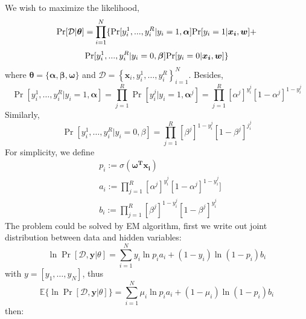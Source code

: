 \documentclass{article}
\begin{document}
We wish to maximize the likelihood,
$$\textup{Pr}[\mathcal{D}|\bm{\theta}]=\prod^{N}_{i=1}\{\textup{Pr}[y_i^1,...,y_i^R|y_i=1,\bm{\alpha}]\textup{Pr}[y_i=1|\bm{x_i},\bm{w}]+$$
$$\textup{Pr}[y_i^1,...,y_i^R|y_i=0,\bm{\beta}]\textup{Pr}[y_i=0|\bm{x_i},\bm{w}]\}$$
where $\bm{\theta} = \{\bm{\alpha,\beta,\omega}\}$ and $\mathcal{D}=\left\{ \boldsymbol { x } _ { i } , y _ { i } ^ { 1 } , \ldots , y _ { i } ^ { R } \right\} _ { i = 1 } ^ { N }$. Besides, $$\operatorname { Pr } \left[ y _ { i } ^ { 1 } , \ldots , y _ { i } ^ { R } | y _ { i } = 1 , \boldsymbol { \alpha } \right] = \prod _ { j = 1 } ^ { R } \operatorname { Pr } \left[ y _ { i } ^ { j } | y _ { i } = 1 , \mathbf { \alpha } ^ { j } \right] = \prod _ { j = 1 } ^ { R } \left[ \alpha ^ { j } \right] ^ { y _ { i } ^ { j } } \left[ 1 - \alpha ^ { j } \right] ^ { 1 - y _ { i } ^ { j } }$$
Similarly,
$$
\operatorname { Pr } \left[ y _ { i } ^ { 1 } , \ldots , y _ { i } ^ { R } | y _ { i } = 0 , \beta \right] = \prod _ { j = 1 } ^ { R } \left[ \beta ^ { j } \right] ^ { 1 - y _ { i } ^ { j } } \left[ 1 - \beta ^ { j } \right] ^ { j _ { i } ^ { j } }
$$
For simplicity, we define
    \begin{align*}
        &p_i:=\sigma(\bm{\omega^T}\bm{x_i})\\
        &a_i:=\prod^R_{j=1}[\alpha^j]^{y_i^j}[1-\alpha^j]^{1-y_i^j}]\\
        &b_i:=\prod^R_{j=1}[\beta^j]^{1-y_i^j}[1-\beta^j]^{y_i^j}
    \end{align*}
The problem could be solved by EM algorithm, first we write out joint distribution between data and hidden variables:
$$
\ln \operatorname { Pr } [ \mathcal { D } , \boldsymbol { y } | \theta ] = \sum _ { i = 1 } ^ { N } y _ { i } \ln p _ { i } a _ { i } + \left( 1 - y _ { i } \right) \ln \left( 1 - p _ { i } \right) b _ { i }
$$
with $y = \left[ y _ { 1 } , \ldots , y _ { N } \right]$, thus
$$
\mathbb { E } \{ \ln \operatorname { Pr } [ \mathcal { D } , \boldsymbol { y } | \theta ] \} = \sum _ { i = 1 } ^ { N } \mu _ { i } \ln p _ { i } a _ { i } + \left( 1 - \mu _ { i } \right) \ln \left( 1 - p _ { i } \right) b _ { i }
$$
then:
\end{document}
